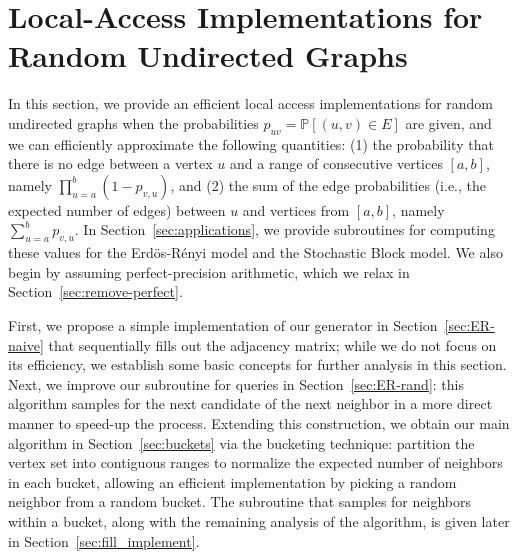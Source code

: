 \section{Local-Access Implementations for Random Undirected Graphs}
\label{sec:undirected}

In this section, we provide an efficient local access implementations for random undirected graphs
when the probabilities $p_{uv}=\mathbb P[(u,v)\in E]$ are given, and we can efficiently approximate the following quantities:
(1) the probability that there is no edge between a vertex $u$ and a range of consecutive vertices $[a,b]$, namely $\prod_{u=a}^b (1-p_{v,u})$, and
(2) the sum of the edge probabilities (i.e., the expected number of edges) between $u$ and vertices from $[a,b]$, namely $\sum_{u=a}^b p_{v,u}$.
In Section~\ref{sec:applications}, we provide subroutines for computing these values for the Erd\"{o}s-R\'{e}nyi model and the Stochastic Block model.
We also begin by assuming perfect-precision arithmetic, which we relax in Section~\ref{sec:remove-perfect}.

First, we propose a simple implementation of our generator in Section~\ref{sec:ER-naive} that sequentially fills out the adjacency matrix;
while we do not focus on its efficiency, we establish some basic concepts for further analysis in this section.
Next, we improve our subroutine for  queries in Section~\ref{sec:ER-rand}:
this algorithm samples for the next candidate of the next neighbor in a more direct manner to speed-up the process.
Extending this construction, we obtain our main algorithm in Section~\ref{sec:buckets} via the bucketing technique:
partition the vertex set into contiguous ranges to normalize the expected number of neighbors in each bucket,
allowing an efficient  implementation by picking a random neighbor from a random bucket.
The subroutine that samples for neighbors within a bucket, along with the remaining analysis of the algorithm,
is given later in Section~\ref{sec:fill_implement}.

\iffalse
{\color{blue}
Alternatively, we provide an implementation for these two models with a deterministic performance guarantee in Section~\ref{sec:ER-det}.
In this setting, introducing the \func{Vertex-Pair} queries results in an amortized guarantee on the run-time.
The deterministic guarantee comes at the cost of more complicated data-structures
(we use a two-level nested interval tree and binary search tree).
}
\fi




